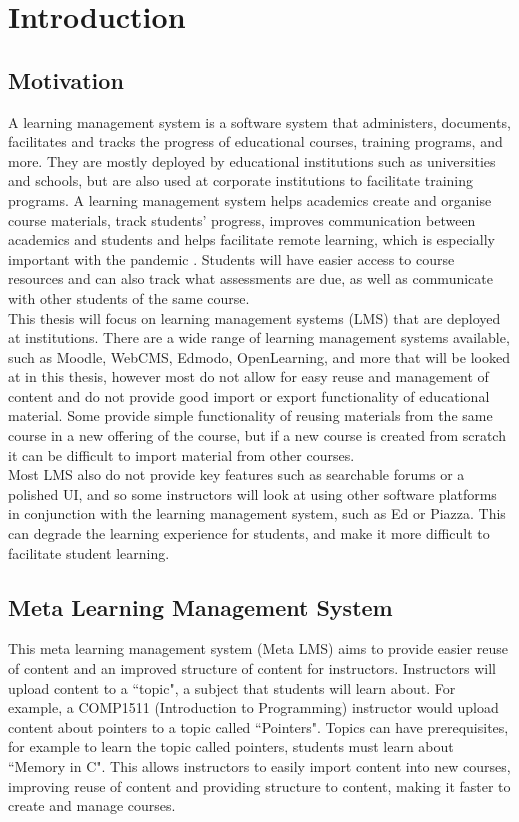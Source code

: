 \chapter{Introduction}\label{ch:intro}

\section{Motivation}
A learning management system is a software system that administers, documents, facilitates and tracks the progress of educational courses, training programs, and more. They are mostly deployed by educational institutions such as universities and schools, but are also used at corporate institutions to facilitate training programs\cite{lmsdefinition}. A learning management system helps academics create and organise course materials, track students' progress, improves communication between academics and students and helps facilitate remote learning, which is especially important with the pandemic \cite{lmsreasons}. Students will have easier access to course resources and can also track what assessments are due, as well as communicate with other students of the same course.\\

This thesis will focus on learning management systems (LMS) that are deployed at institutions. There are a wide range of learning management systems available, such as Moodle, WebCMS, Edmodo, OpenLearning, and more that will be looked at in this thesis, however most do not allow for easy reuse and management of content and do not provide good import or export functionality of educational material. Some provide simple functionality of reusing materials from the same course in a new offering of the course, but if a new course is created from scratch it can be difficult to import material from other courses.\\

Most LMS also do not provide key features such as searchable forums or a polished UI, and so some instructors will look at using other software platforms in conjunction with the learning management system, such as Ed or Piazza. This can degrade the learning experience for students, and make it more difficult to facilitate student learning.\\

\section{Meta Learning Management System}
This meta learning management system (Meta LMS) aims to provide easier reuse of content and an improved structure of content for instructors. Instructors will upload content to a ``topic", a subject that students will learn about. For example, a COMP1511 (Introduction to Programming) instructor would upload content about pointers to a topic called ``Pointers". Topics can have prerequisites, for example to learn the topic called pointers, students must learn about ``Memory in C". This allows instructors to easily import content into new courses, improving reuse of content and providing structure to content, making it faster to create and manage courses.\\

